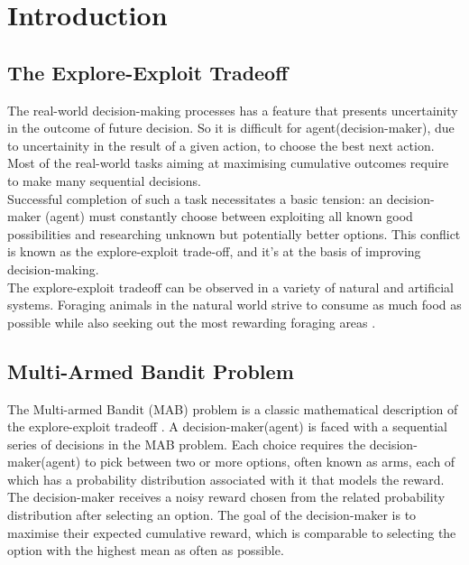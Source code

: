 \chapter{Introduction}\label{ch:introduction}
\section{The Explore-Exploit Tradeoff}
The real-world decision-making processes has a feature that presents uncertainity in the outcome of future decision. 
So it is difficult for agent(decision-maker), due to uncertainity in the result of a given action, to choose the best next action. 
Most of the real-world tasks aiming at maximising cumulative outcomes require to make many sequential decisions.\\
Successful completion of such a task necessitates a basic tension: an decision-maker (agent) must constantly choose between exploiting all 
known good possibilities and researching unknown but potentially better options. 
This conflict is known as the explore-exploit trade-off, and it's at the basis of improving decision-making.\\
The explore-exploit tradeoff can be observed in a variety of natural and artificial systems. 
Foraging animals in the natural world strive to consume as much food as possible while also seeking out the most rewarding foraging areas \cite{Keasar:2002}.

\section{Multi-Armed Bandit Problem}
The Multi-armed Bandit (MAB) problem is a classic mathematical description of the explore-exploit tradeoff \cite{Robbins:1952}. 
A decision-maker(agent) is faced with a sequential series of decisions in the MAB problem. 
Each choice requires the decision-maker(agent) to pick between two or more options, often known as arms, 
each of which has a probability distribution associated with it that models the reward. 
The decision-maker receives a noisy reward chosen from the related probability distribution after selecting an option. 
The goal of the decision-maker is to maximise their expected cumulative reward, 
which is comparable to selecting the option with the highest mean as often as possible.